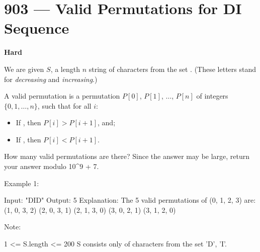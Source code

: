 \section{903 --- Valid Permutations for DI Sequence}

\textbf{Hard}

We are given $S$, a length $n$ string of characters from the set . (These letters stand for \textit{decreasing} and \textit{increasing}.)

A valid permutation is a permutation $P[0]$, $P[1]$, $\ldots$, $P[n]$ of integers $\{0, 1, \ldots, n\}$, such that for all $i$:

\begin{itemize}
\item If , then $P[i] > P[i+1]$, and;
\item If , then $P[i] < P[i+1]$.
\end{itemize}

How many valid permutations are there?  Since the answer may be large, return your answer modulo 10^9 + 7.

 

Example 1:

Input: "DID"
Output: 5
Explanation: 
The 5 valid permutations of (0, 1, 2, 3) are:
(1, 0, 3, 2)
(2, 0, 3, 1)
(2, 1, 3, 0)
(3, 0, 2, 1)
(3, 1, 2, 0)

 

Note:

    1 <= S.length <= 200
    S consists only of characters from the set {'D', 'I'}.

